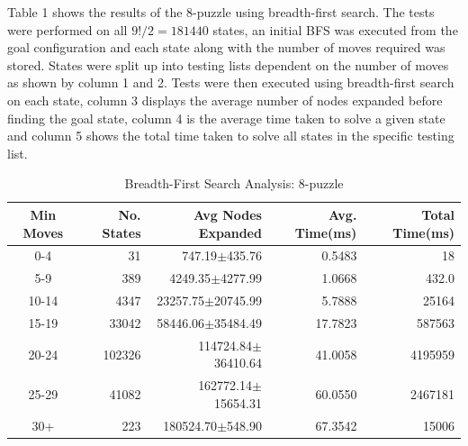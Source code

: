 \documentclass[final]{cmpreport}
\begin{document}
Table 1 shows the results of the 8-puzzle using breadth-first search. The tests were performed on all $9!/2=181440$ states, an initial BFS was executed from the goal configuration and each state along with the number of moves required was stored. States were split up into testing lists dependent on the number of moves as shown by column 1 and 2. Tests were then executed using breadth-first search on each state, column 3 displays the average number of nodes expanded before finding the goal state, column 4 is the average time taken to solve a given state and column 5 shows the total time taken to solve all states in the specific testing list.
\begin{table}[ht]
	\caption{Breadth-First Search Analysis: 8-puzzle}
	\begin{center}
		\begin{tabular}{crrrr} \hline
			Min Moves & No. States & Avg Nodes Expanded & Avg. Time(ms) & Total Time(ms) \\ \hline
			0-4  & 31 & 747.19$\pm$435.76 & 0.5483 & 18 \\
			5-9 & 389 &4249.35$\pm$4277.99& 1.0668 & 432.0 \\ 
			10-14 & 4347 &  23257.75$\pm$20745.99& 5.7888 & 25164  \\ 
			15-19 & 33042& 58446.06$\pm$35484.49 & 17.7823 & 587563 \\ 
			20-24 & 102326& 114724.84$\pm$36410.64 & 41.0058 & 4195959  \\ 
			25-29 & 41082& 162772.14$\pm$15654.31 & 60.0550 & 2467181 \\ 
			30+ & 223& 180524.70$\pm$548.90 & 67.3542 & 15006\\ \hline
		\end{tabular}
	\end{center}
\end{table}
\end{document}
